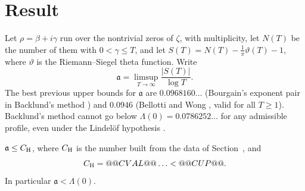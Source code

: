 \begin{abstract}
Let $\mathfrak a=\limsup_{T\to\infty}|S(T)|/\log T$. It is proved that $\mathfrak a<@@CUP@@$, which is smaller than the value $\Lambda(0)=\frac{3\sqrt3-\pi}{12\pi\log2}=0.0786252\ldots$ that Backlund's method gives under the Lindel\"of hypothesis. The proof combines the identity of Turing type used by Amberger and by Bellotti and Wong with Jensen's formula on small discs to the right of the critical line, where the number of zeros near $\beta=1$ is controlled by Bourgain's exponent pair. The only inequality that is not proved by hand is a two-variable inequality between explicit elementary functions; it is certified with Arb ball arithmetic on the whole half-strip.
\end{abstract}

\maketitle
\tableofcontents

\section{Result}\label{sec:result}

Let $\rho=\beta+i\gamma$ run over the nontrivial zeros of $\zeta$, with multiplicity, let $N(T)$ be the number of them with $0<\gamma\le T$, and let $S(T)=N(T)-\frac1\pi\vartheta(T)-1$, where $\vartheta$ is the Riemann--Siegel theta function. Write
\begin{equation}
\mathfrak a=\limsup_{T\to\infty}\frac{|S(T)|}{\log T}.
\label{eq:a_def}
\end{equation}
The best previous upper bounds for $\mathfrak a$ are $0.0968160\ldots$ (Bourgain's exponent pair in Backlund's method \cite[Cor.~1.2]{CasanaGiner2026}) and $0.0946$ (Bellotti and Wong \cite[Cor.~1.3]{BellottiWong2026}, valid for all $T\ge1$). Backlund's method cannot go below $\Lambda(0)=0.0786252\ldots$ for any admissible profile, even under the Lindel\"of hypothesis \cite[Remark~5.2]{CasanaGiner2026}.

\begin{theorem}\label{thm:main}
$\mathfrak a\le C_{\rm H}$, where $C_{\rm H}$ is the number  built from the data of Section~, and
\begin{equation}
C_{\rm H}=@@CVAL@@\ldots<@@CUP@@ .
\label{eq:CH_value}
\end{equation}
In particular $\mathfrak a<\Lambda(0)$.
\end{theorem}


